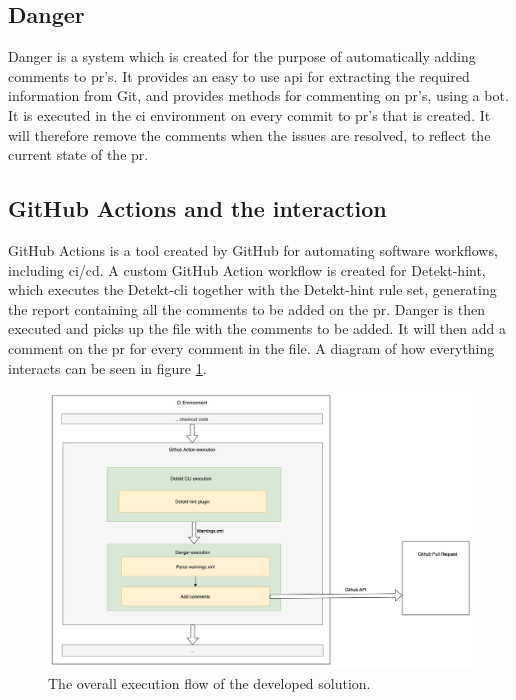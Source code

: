 \documentclass[pdftex,10pt,b5paper,twoside]{report}
\begin{document}

\subsection{Danger}
Danger is a system which is created for the purpose of automatically adding comments to \gls{pr}'s. It provides an easy to use \gls{api} for extracting the required information from Git, and provides methods for commenting on \gls{pr}'s, using a bot. It is executed in the \gls{ci} environment on every commit to \gls{pr}'s that is created. It will therefore remove the comments when the issues are resolved, to reflect the current state of the \gls{pr}. 

\subsection{GitHub Actions and the interaction}
GitHub Actions is a tool created by GitHub for automating software workflows, including \gls{ci}/\gls{cd}. A custom GitHub Action workflow is created for Detekt-hint, which executes the Detekt-\gls{cli} together with the Detekt-hint rule set, generating the report containing all the comments to be added on the \gls{pr}. Danger is then executed and picks up the file with the comments to be added. It will then add a comment on the \gls{pr} for every comment in the file. A diagram of how everything interacts can be seen in figure \ref{fig:integration}. 


\begin{figure}
    \centering
    \includegraphics[width=\textwidth]{images/detekt-hint-execution.png}
    \caption{The overall execution flow of the developed solution.}
    \label{fig:integration}
\end{figure}
\end{document}
